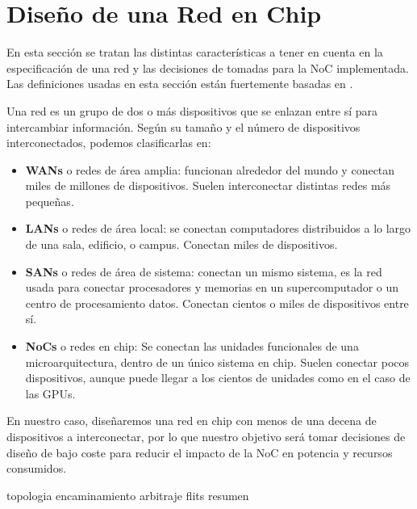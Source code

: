 \chapter{Diseño de una Red en Chip}
\label{chap:desNoC}

En esta sección se tratan las distintas características a tener en cuenta en la especificación de una red y las decisiones de tomadas para la NoC implementada. Las definiciones usadas en esta sección están fuertemente basadas en \cite{HenessyPattersonF,AC5,Duato03}.

Una red es un grupo de dos o más dispositivos que se enlazan entre sí para intercambiar información. Según su tamaño y el número de dispositivos interconectados, podemos clasificarlas en:

\begin{itemize}[noitemsep]
    \item \textbf{WANs} o redes de área amplia: funcionan alrededor del mundo y conectan miles de millones de dispositivos. Suelen interconectar distintas redes más pequeñas.
    \item \textbf{LANs} o redes de área local: se conectan computadores distribuidos a lo largo de una sala, edificio, o campus. Conectan miles de dispositivos.
    \item \textbf{SANs} o redes de área de sistema: conectan un mismo sistema, es la red usada para conectar procesadores y memorias en un supercomputador o un centro de procesamiento datos. Conectan cientos o miles de dispositivos entre sí.
    \item \textbf{NoCs} o redes en chip: Se conectan las unidades funcionales de una microarquitectura, dentro de un único sistema en chip. Suelen conectar pocos dispositivos, aunque puede llegar a los cientos de unidades como en el caso de las GPUs.
\end{itemize}

\begin{recuadronoc}
    En nuestro caso, diseñaremos una red en chip con menos de una decena de dispositivos a interconectar, por lo que nuestro objetivo será tomar decisiones de diseño de bajo coste para reducir el impacto de la NoC en potencia y recursos consumidos.
\end{recuadronoc}

{topologia}
{encaminamiento}
{arbitraje}
{flits}
{resumen}



